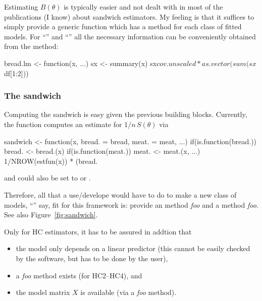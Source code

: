 \documentclass{Z}
\begin{document}
Estimating $B(\theta)$ is typically easier and not dealt with in most of the publications
(I know) about sandwich estimators. My feeling is that it suffices to simply provide a 
generic function  which has a method for each class of fitted models.
For ``'' and ``'' all the necessary information can be conveniently
obtained from the  method:
\begin{Schunk}
\begin{Sinput}
bread.lm <- function(x, ...)
{
  sx <- summary(x)
  sx$cov.unscaled * as.vector(sum(sx$df[1:2]))
}
\end{Sinput}
\end{Schunk}


\subsubsection*{The sandwich}

Computing the sandwich is easy given the previous building blocks. Currently, the 
function  computes an estimate for $1/n \, S(\theta)$ via
\begin{Schunk}
\begin{Sinput}
sandwich <- function(x, bread. = bread, meat. = meat, ...)
{
  if(is.function(bread.)) bread. <- bread.(x)
  if(is.function(meat.)) meat. <- meat.(x, ...)
  1/NROW(estfun(x)) * (bread. %*% meat. %*% bread.)
}
\end{Sinput}
\end{Schunk}
and  could also be set to  or . 

Therefore, all that a
use/develope would have to do to make a new class of models, 
``'' say, fit for this framework is: 
provide an  method \emph{foo}\code{()}
and a  method \emph{foo}\code{()}. See also Figure~\ref{fig:sandwich}.

Only for HC estimators, it has to be assured in addtion that 
\begin{itemize}
  \item the model only depends on a linear predictor (this cannot be easily
        checked by the software, but has to be done by the user),
  \item a \emph{foo}\code{()} method exists (for HC2--HC4), and
  \item the model matrix $X$ is available (via a \emph{foo}\code{()} method).
\end{itemize}
\end{document}
